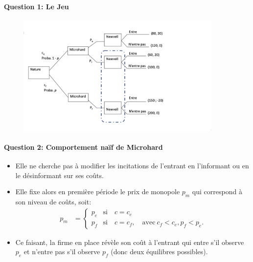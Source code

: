 \documentclass[notes, ignorenonframetext, compress, 9pt, xcolor=svgnames, aspectratio=169]{beamer}
\begin{document}
\begin{frame}
  [allowframebreaks]{\insertsection}
  \framesubtitle{Question 1: Le Jeu}
\begin{figure}
  \begin{center}
  \includegraphics[width=4in]{Arbreq1figAlexis.png}
\end{center}
\end{figure}
\end{frame}  
\begin{frame}
[allowframebreaks]{\insertsection}
\framesubtitle{Question 2: Comportement naïf de Microhard}
\begin{itemize}
  \item Elle ne cherche pas à modifier les incitations de l’entrant en l’informant ou en le désinformant sur ses coûts.
  \item Elle fixe alors en première période le prix de monopole $p_m$
   qui correspond à son niveau 
  de coûts, soit:
  \begin{align*}
    p_m &=\left\{
    \begin{array}{ll}
     p_e &\text{si} \quad c = c_e\\
     p_f &\text{si} \quad c = c_f, \quad \text{avec} \ c_f < c_e, p_f < p_e.
    \end{array}
    \right.
  \end{align*}
  \item Ce faisant, la firme en place révèle son coût à l’entrant qui entre s’il
   observe $p_e$ et n’entre pas s’il observe $p_f$ (donc deux équilibres possibles).
\end{itemize}
\end{frame}  
\end{document}
